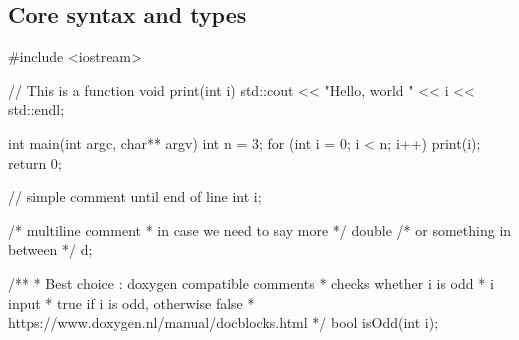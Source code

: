 \subsection[Core]{Core syntax and types}

\begin{frame}[fragile]
  \begin{cppcode}
    #include <iostream>

    // This is a function
    void print(int i) {
      std::cout << "Hello, world " << i << std::endl;
    }

    int main(int argc, char** argv) {
      int n = 3;
      for (int i = 0; i < n; i++) {
        print(i);
      }
      return 0;
    }
  \end{cppcode}
\end{frame}

\begin{frame}[fragile]
  \begin{cppcode}
    // simple comment until end of line
    int i;

    /* multiline comment
     * in case we need to say more
     */
    double /* or something in between */ d;

    /**
     * Best choice : doxygen compatible comments
     * \brief checks whether i is odd
     * \param i input
     * \return true if i is odd, otherwise false
     * \see https://www.doxygen.nl/manual/docblocks.html
     */
    bool isOdd(int i);
  \end{cppcode}
\end{frame}

